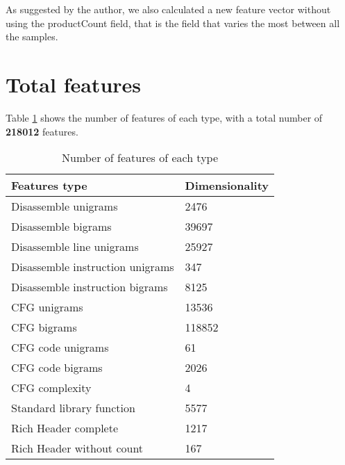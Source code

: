 As suggested by the author, we also calculated a new feature vector without using the productCount field, that is the field that varies the most between all the samples.

\section{Total features}
Table \ref{tab:num_feat} shows the number of features of each type, with a total number of \textbf{218012} features.

\begin{table}[!htb]
		\centering
		\caption{Number of features of each type}
		\label{tab:num_feat}
			\begin{tabular}{ll}
				\toprule
				Features type                    & Dimensionality \\
				\midrule
				Disassemble unigrams             & 2476           \\ 
				Disassemble bigrams              & 39697          \\ 
				Disassemble line unigrams        & 25927          \\ 
				Disassemble instruction unigrams & 347            \\ 
				Disassemble instruction bigrams  & 8125           \\ 
				CFG unigrams                     & 13536          \\ 
				CFG bigrams                      & 118852         \\ 
				CFG code unigrams                & 61             \\ 
				CFG code bigrams                 & 2026           \\ 
				CFG complexity                   & 4              \\ 
				Standard library function        & 5577           \\ 
				Rich Header complete             & 1217           \\ 
				Rich Header without count        & 167            \\ 
				\bottomrule
			\end{tabular}
		
\end{table}

